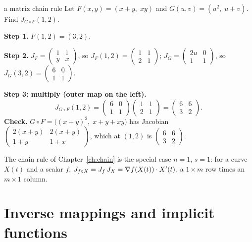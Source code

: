 \begin{example}{a matrix chain rule}
Let $F(x,y)=(x+y,\;xy)$ and $G(u,v)=(u^2,\;u+v)$. Find $J_{G\circ F}(1,2)$.

\textbf{Step 1.} $F(1,2)=(3,2)$.

\textbf{Step 2.} $J_F=\begin{pmatrix}1&1\\y&x\end{pmatrix}$, so $J_F(1,2)=\begin{pmatrix}1&1\\2&1\end{pmatrix}$;
$J_G=\begin{pmatrix}2u&0\\1&1\end{pmatrix}$, so $J_G(3,2)=\begin{pmatrix}6&0\\1&1\end{pmatrix}$.

\textbf{Step 3: multiply (outer map on the left).}
\[ J_{G\circ F}(1,2)=\begin{pmatrix}6&0\\1&1\end{pmatrix}\begin{pmatrix}1&1\\2&1\end{pmatrix}=\begin{pmatrix}6&6\\3&2\end{pmatrix}. \]
\textbf{Check.} $G\circ F=\big((x+y)^2,\;x+y+xy\big)$ has Jacobian
$\begin{pmatrix}2(x+y)&2(x+y)\\1+y&1+x\end{pmatrix}$, which at $(1,2)$ is $\begin{pmatrix}6&6\\3&2\end{pmatrix}$.
\end{example}

\begin{keyidea}
The chain rule of Chapter~\ref{ch:chain} is the special case $n=1$, $s=1$: for a curve $X(t)$ and a
scalar $f$, $J_{f\circ X}=J_f\,J_X=\nabla f(X(t))\cdot X'(t)$, a $1\times m$ row times an $m\times1$ column.
\end{keyidea}

\section{Inverse mappings and implicit functions}

